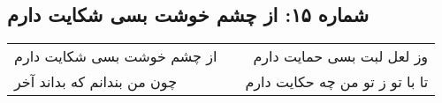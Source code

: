 \begin{center}
\section*{شماره ۱۵: از چشم خوشت بسی شکایت دارم}
\label{sec:015}
\begin{longtable}{l p{0.5cm} r}
از چشم خوشت بسی شکایت دارم
&&
وز لعل لبت بسی حمایت دارم
\\
چون من بندانم که بداند آخر
&&
تا با تو ز تو من چه حکایت دارم
\\
\end{longtable}
\end{center}
